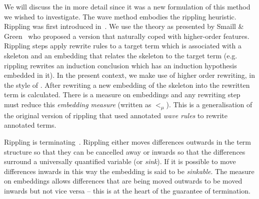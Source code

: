 We will discuss the  in more detail since it was
a new formulation of this method we wished to investigate.  The wave
method embodies the rippling heuristic.  Rippling was first introduced
in~\cite{pub567}.  We use the theory as presented by Smaill \&
Green~\cite{pub799} who proposed a version that naturally coped with
higher-order features.  Rippling steps apply rewrite rules to a target
term which is associated with a skeleton and an embedding
that relates the skeleton to the target term (e.g.
rippling rewrites an induction conclusion which has an
induction hypothesis embedded in it).  In the present context, we make
use of higher order rewriting, in the style of \cite{Fel92}.  After rewriting a new embedding of the skeleton into the rewritten term is calculated.  There is
a measure on embeddings and any rewriting step must reduce this
\emph{embedding measure} (written as $<_{\mu}$).  This is a
generalisation of the original version of rippling that used annotated
\emph{wave rules} to rewrite annotated terms.

Rippling is terminating~\cite{BasinWalsh96}.  Rippling either moves
differences outwards in the term structure so that they can be
cancelled away or inwards so that the differences surround a
universally quantified variable (or \emph{sink}).  If it is possible
to move differences inwards in this way the embedding is said to be
\emph{sinkable}.  The measure on embeddings allows differences that
are being moved outwards to be moved inwards but not vice versa --
this is at the heart of the guarantee of termination.

